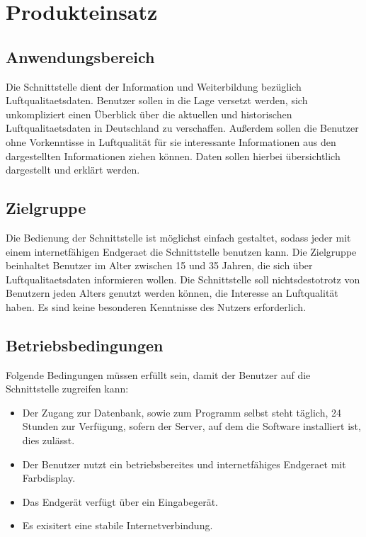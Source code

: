 \section{Produkteinsatz}
\subsection{Anwendungsbereich}
Die Schnittstelle dient der Information und Weiterbildung bezüglich \gls{Luftqualitaetsdaten}. 
Benutzer sollen in die Lage versetzt werden, sich unkompliziert
einen Überblick über die aktuellen und historischen \gls{Luftqualitaetsdaten} in Deutschland zu verschaffen.
Außerdem sollen die Benutzer ohne Vorkenntisse in Luftqualität für sie interessante Informationen aus den dargestellten
Informationen ziehen können. Daten sollen hierbei übersichtlich dargestellt und erklärt werden.
\subsection{Zielgruppe}
Die Bedienung der Schnittstelle ist möglichst einfach gestaltet, sodass jeder mit einem internetfähigen \Gls{Endgeraet} die Schnittstelle benutzen kann.
Die Zielgruppe beinhaltet Benutzer im Alter zwischen 15 und 35 Jahren, die sich über \gls{Luftqualitaetsdaten} informieren wollen. 
Die Schnittstelle soll nichtsdestotrotz von Benutzern jeden Alters genutzt werden können, die Interesse an Luftqualität haben.
Es sind keine besonderen Kenntnisse des Nutzers erforderlich.
\subsection{Betriebsbedingungen}
Folgende Bedingungen müssen erfüllt sein, damit der Benutzer auf die Schnittstelle zugreifen kann:
\begin{itemize}
    \item Der Zugang zur Datenbank, sowie zum Programm selbst steht täglich,
    24 Stunden zur Verfügung, sofern der Server, auf dem die Software installiert ist,
    dies zulässt.
    \item Der Benutzer nutzt ein betriebsbereites und internetfähiges \gls{Endgeraet} mit Farbdisplay.
    \item Das Endgerät verfügt über ein Eingabegerät.
    \item Es exisitert eine stabile Internetverbindung.
\end{itemize}
